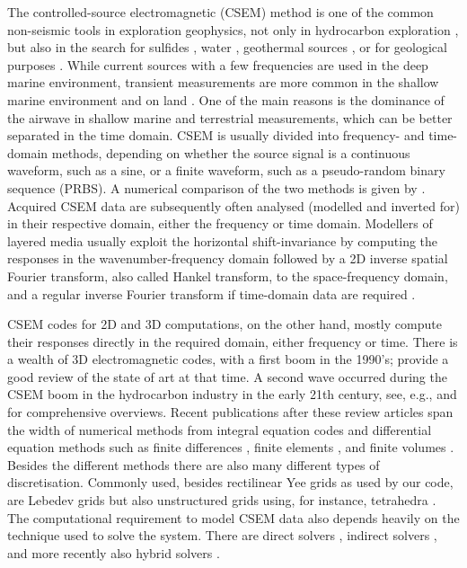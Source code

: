 \documentclass[extra, camera,%
    onecolumn,   %
    referee,     %
]{gji}
\begin{document}
The controlled-source electromagnetic (CSEM) method is one of the common
non-seismic tools in exploration geophysics, not only in hydrocarbon
exploration \citep{GEO.10.Constable}, but also in the search for sulfides
\citep{GRL.19.Gehrmann}, water \citep{GEO.05.Pedersen}, geothermal sources
\citep{WGC.15.Girard}, or for geological purposes \citep{NAT.19.Johanson}.
While current sources with a few frequencies are used in the deep marine
environment, transient measurements are more common in the shallow marine
environment and on land \citep[e.g., ][]{GEO.07.Ziolkowski, SEG.07.Andreis,
SEG.07.Avdeeva}. One of the main reasons is the dominance of the airwave in
shallow marine and terrestrial measurements, which can be better separated in
the time domain. CSEM is usually divided into frequency- and time-domain
methods, depending on whether the source signal is a continuous waveform, such
as a sine, or a finite waveform, such as a pseudo-random binary sequence
(PRBS). A numerical comparison of the two methods is given by
\cite{GP.13.Conell}. Acquired CSEM data are subsequently often analysed
(modelled and inverted for) in their respective domain, either the frequency or
time domain. Modellers of layered media usually exploit the horizontal
shift-invariance by computing the responses in the wavenumber-frequency domain
followed by a 2D inverse spatial Fourier transform, also called Hankel
transform, to the space-frequency domain, and a regular inverse Fourier
transform if time-domain data are required \citep[e.g., ][]{GEO.15.Hunziker}.

CSEM codes for 2D and 3D computations, on the other hand, mostly compute their
responses directly in the required domain, either frequency or time. There is a
wealth of 3D electromagnetic codes, with a first boom in the 1990's;
\cite{B.SEG.99.Oristaglio} provide a good review of the state of art at that
time. A second wave occurred during the CSEM boom in the hydrocarbon industry
in the early 21th century, see, e.g., \cite{SG.05.Avdeev} and
\cite{SG.10.Borner} for comprehensive overviews. Recent publications after
these review articles span the width of numerical methods from integral
equation codes \citep{MGS.17.Kruglyakov} and differential equation methods such
as finite differences \citep{GEO.10.Mittet, GEO.11.Zaslavsky, CAG.13.Sommer},
finite elements \citep{GJI.13.Grayver}, and finite volumes
\citep{GEO.14.Jahandari}. Besides the different methods there are also many
different types of discretisation. Commonly used, besides rectilinear Yee grids
\citep{IEEE.66.Yee} as used by our code, are Lebedev grids
\citep{CMMP.64.Lebedev} but also unstructured grids using, for instance,
tetrahedra \citep{CAG.17.Cai}. The computational requirement to model CSEM data
also depends heavily on the technique used to solve the system. There are
direct solvers \citep{GEO.15.Grayver}, indirect solvers
\citep{GJI.15.Jaysaval}, and more recently also hybrid solvers
\citep{GEO.18.Liu}.
\end{document}
